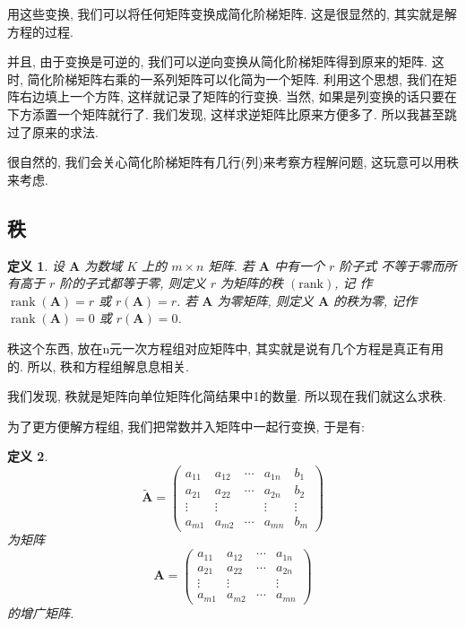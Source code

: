\documentclass{article}
\newtheorem{mydef}{定义}
\begin{document}
用这些变换, 我们可以将任何矩阵变换成简化阶梯矩阵. 这是很显然的, 其实就是解方程的过程.

并且, 由于变换是可逆的, 我们可以逆向变换从简化阶梯矩阵得到原来的矩阵. 这时, 简化阶梯矩阵右乘的一系列矩阵可以化简为一个矩阵. 利用这个思想, 我们在矩阵右边填上一个方阵, 这样就记录了矩阵的行变换. 当然, 如果是列变换的话只要在下方添置一个矩阵就行了. 我们发现, 这样求逆矩阵比原来方便多了. 所以我甚至跳过了原来的求法.

很自然的, 我们会关心简化阶梯矩阵有几行(列)来考察方程解问题, 这玩意可以用秩来考虑.

\subsection{秩}

\begin{mydef}
	设 $\boldsymbol{A}$ 为数域 $K$ 上的 $m \times n$ 矩阵. 若 $\boldsymbol{A}$ 中有一个 $r$ 阶子式 不等于零而所有高于 $r$ 阶的子式都等于零, 则定义 $r$ 为矩阵的秩 $(\mathrm{rank})$, 记 作 $\operatorname{rank}(\boldsymbol{A})=r$ 或 $r(\boldsymbol{A})=r$. 若 $\boldsymbol{A}$ 为零矩阵, 则定义 $\boldsymbol{A}$ 的秩为零, 记作 $\operatorname{rank}(\boldsymbol{A})=0$ 或 $r(\boldsymbol{A})=0$.
\end{mydef}
秩这个东西, 放在n元一次方程组对应矩阵中, 其实就是说有几个方程是真正有用的. 所以, 秩和方程组解息息相关.

我们发现, 秩就是矩阵向单位矩阵化简结果中1的数量. 所以现在我们就这么求秩.

为了更方便解方程组, 我们把常数并入矩阵中一起行变换, 于是有:
\begin{mydef}
$$
\tilde{\boldsymbol{A}}=\left(\begin{array}{ccccc}
	a_{11} & a_{12} & \cdots & a_{1 n} & b_{1} \\
	a_{21} & a_{22} & \cdots & a_{2 n} & b_{2} \\
	\vdots & \vdots & & \vdots & \vdots \\
	a_{m 1} & a_{m 2} & \cdots & a_{m n} & b_{m}
\end{array}\right)
$$
为矩阵
$$
{\boldsymbol{A}}=\left(\begin{array}{cccc}
	a_{11} & a_{12} & \cdots & a_{1 n} \\
	a_{21} & a_{22} & \cdots & a_{2 n}  \\
	\vdots & \vdots & & \vdots \\
	a_{m 1} & a_{m 2} & \cdots & a_{m n}
\end{array}\right)
$$
的增广矩阵.
\end{mydef}
\end{document}
